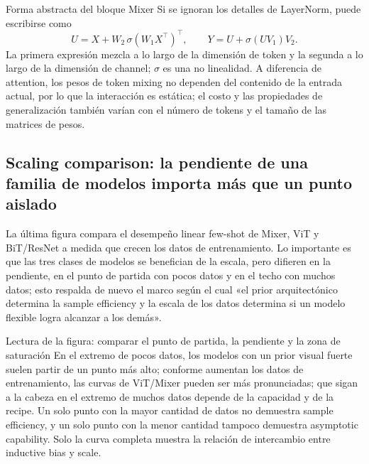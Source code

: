 
\begin{importantbox}{Forma abstracta del bloque Mixer}
Si se ignoran los detalles de LayerNorm, puede escribirse como
\[
U=X+W_2\,\sigma(W_1X^{\top})^{\top},\qquad
Y=U+\sigma(UV_1)V_2.
\]
La primera expresión mezcla a lo largo de la dimensión de token y la segunda a lo largo de la dimensión de channel; $\sigma$ es una no linealidad. A diferencia de attention, los pesos de token mixing no dependen del contenido de la entrada actual, por lo que la interacción es estática; el costo y las propiedades de generalización también varían con el número de tokens y el tamaño de las matrices de pesos.
\end{importantbox}

\subsection{Scaling comparison: la pendiente de una familia de modelos importa más que un punto aislado}

La última figura compara el desempeño linear few-shot de Mixer, ViT y BiT/ResNet a medida que crecen los datos de entrenamiento. Lo importante es que las tres clases de modelos se benefician de la escala, pero difieren en la pendiente, en el punto de partida con pocos datos y en el techo con muchos datos; esto respalda de nuevo el marco según el cual «el prior arquitectónico determina la sample efficiency y la escala de los datos determina si un modelo flexible logra alcanzar a los demás».


\begin{knowledgebox}{Lectura de la figura: comparar el punto de partida, la pendiente y la zona de saturación}
En el extremo de pocos datos, los modelos con un prior visual fuerte suelen partir de un punto más alto; conforme aumentan los datos de entrenamiento, las curvas de ViT/Mixer pueden ser más pronunciadas; que sigan a la cabeza en el extremo de muchos datos depende de la capacidad y de la recipe. Un solo punto con la mayor cantidad de datos no demuestra sample efficiency, y un solo punto con la menor cantidad tampoco demuestra asymptotic capability. Solo la curva completa muestra la relación de intercambio entre inductive bias y scale.
\end{knowledgebox}

